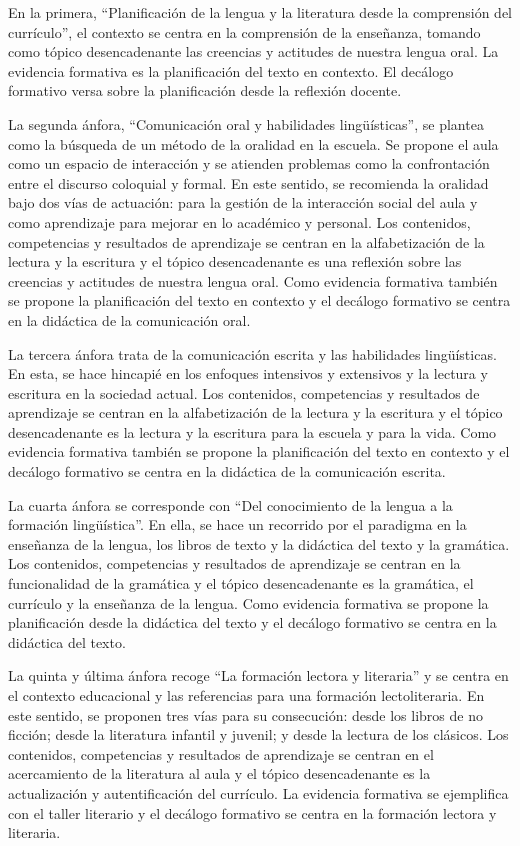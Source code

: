 \documentclass[spanish]{textolivre}
\begin{document}
En la primera, “Planificación de la lengua y la literatura desde la comprensión del currículo”, el contexto se centra en la comprensión de la enseñanza, tomando como tópico desencadenante las creencias y actitudes de nuestra lengua oral. La evidencia formativa es la planificación del texto en contexto. El decálogo formativo versa sobre la planificación desde la reflexión docente.  

La segunda ánfora, “Comunicación oral y habilidades lingüísticas”, se plantea como la búsqueda de un método de la oralidad en la escuela. Se propone el aula como un espacio de interacción y se atienden problemas como la confrontación entre el discurso coloquial y formal. En este sentido, se recomienda la oralidad bajo dos vías de actuación: para la gestión de la interacción social del aula y como aprendizaje para mejorar en lo académico y personal. Los contenidos, competencias y resultados de aprendizaje se centran en la alfabetización de la lectura y la escritura y el tópico desencadenante es una reflexión sobre las creencias y actitudes de nuestra lengua oral. Como evidencia formativa también se propone la planificación del texto en contexto y el decálogo formativo se centra en la didáctica de la comunicación oral.

La tercera ánfora trata de la comunicación escrita y las habilidades lingüísticas. En esta, se hace hincapié en los enfoques intensivos y extensivos y la lectura y escritura en la sociedad actual. Los contenidos, competencias y resultados de aprendizaje se centran en la alfabetización de la lectura y la escritura y el tópico desencadenante es la lectura y la escritura para la escuela y para la vida. Como evidencia formativa también se propone la planificación del texto en contexto y el decálogo formativo se centra en la didáctica de la comunicación escrita.

La cuarta ánfora se corresponde con “Del conocimiento de la lengua a la formación lingüística”. En ella, se hace un recorrido por el paradigma en la enseñanza de la lengua, los libros de texto y la didáctica del texto y la gramática. Los contenidos, competencias y resultados de aprendizaje se centran en la funcionalidad de la gramática y el tópico desencadenante es la gramática, el currículo y la enseñanza de la lengua. Como evidencia formativa se propone la planificación desde la didáctica del texto y el decálogo formativo se centra en la didáctica del texto.

La quinta y última ánfora recoge “La formación lectora y literaria” y se centra en el contexto educacional y las referencias para una formación lectoliteraria. En este sentido, se proponen tres vías para su consecución: desde los libros de no ficción; desde la literatura infantil y juvenil; y desde la lectura de los clásicos. Los contenidos, competencias y resultados de aprendizaje se centran en el acercamiento de la literatura al aula y el tópico desencadenante es la actualización y autentificación del currículo. La evidencia formativa se ejemplifica con el taller literario y el decálogo formativo se centra en la formación lectora y literaria.
\end{document}
